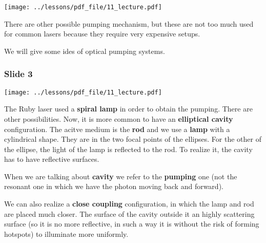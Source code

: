\documentclass[../main/main.tex]{subfiles}
\begin{document}
\begin{minipage}[]{0.5\linewidth}
\centering
\texttt{[image: ../lessons/pdf\_file/11\_lecture.pdf]}
\end{minipage}
\hspace{0.3cm}\vspace{0.3cm}
\begin{minipage}[c]{0.47\linewidth}

There are other possible pumping mechanism, but these are not too much used for common lasers because they require very expensive setups.

We will give some ides of optical pumping systems.

\end{minipage}

\subsubsection*{Slide 3}

\begin{minipage}[]{0.5\linewidth}
\centering
\texttt{[image: ../lessons/pdf\_file/11\_lecture.pdf]}
\end{minipage}
\hspace{0.3cm}\vspace{0.3cm}
\begin{minipage}[c]{0.47\linewidth}

The Ruby laser used a \textbf{spiral lamp} in order to obtain the pumping. There are other possibilities. Now, it is more common to have an \textbf{elliptical cavity} configuration. The acitve medium is the \textbf{rod} and we use a \textbf{lamp} with a cylindrical shape. They are in the two focal points of the ellipses. For the other of the ellipse, the light of the lamp is reflected to the rod. To realize it, the cavity has to have reflective surfaces.

When we are talking about \textbf{cavity} we refer to the \textbf{pumping} one (not the resonant one in which we have the photon moving back and forward).

We can also realize a \textbf{close coupling} configuration, in which the lamp and rod are placed much closer. The surface of the cavity outside it an highly scattering surface (so it is no more reflective, in such a way it is without the risk of forming hotspots) to illuminate more uniformly.

\end{minipage}
\end{document}
